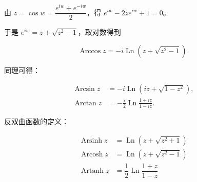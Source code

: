 由 \(z=\cos w=\dfrac{e^{iw}+e^{-iw}}{2}\)，得 \(e^{iw}-2ze^{iw}+1=0\)。

于是 \(e^{iw}=z+\sqrt{z^2-1}\)，取对数得到

\[
\operatorname{Arccos}z=-i\operatorname{Ln}(z+\sqrt{z^2-1}).
\]

同理可得：

\begin{equation*}
\begin{aligned}
    \operatorname{Arcsin}z&=-i\operatorname{Ln}(iz+\sqrt{1-z^2}), \\
    \operatorname{Arctan}z&=-\frac{i}{2}\operatorname{Ln}\frac{1+iz}{1-iz}.
\end{aligned}
\end{equation*}

反双曲函数的定义：

\begin{equation*}
\begin{aligned}
 \operatorname{Arsinh}z &= \operatorname{Ln}(z + \sqrt{z^{2}+1}) \\
\operatorname{Arcosh}z &= \operatorname{Ln}(z + \sqrt{z^{2} - 1}) \\
\operatorname{Artanh}z &= \dfrac{1}{2}\operatorname{Ln}\dfrac{1 + z}{1 - z}
\end{aligned}
\end{equation*}
